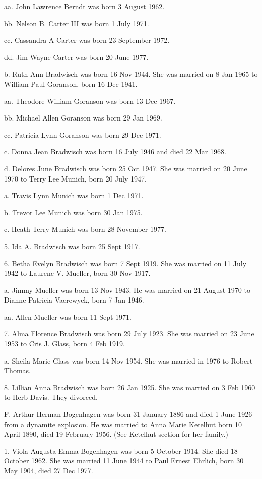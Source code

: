\documentclass[a4paper]{article}
\begin{document}
aa. John Lawrence Berndt was born 3 August 1962.

bb. Nelson B. Carter III was born 1 July 1971.

cc. Cassandra A Carter was born 23 September 1972.

dd. Jim Wayne Carter was born 20 June 1977.

b. Ruth Ann Bradwisch was born 16 Nov 1944.  She was married on 8 Jan 1965 to William Paul Goranson, born 16 Dec 1941.
 
aa. Theodore William Goranson was born 13 Dec 1967.

bb. Michael Allen Goranson was born 29 Jan 1969.

cc. Patricia Lynn Goranson was born 29 Dec 1971.

c. Donna Jean Bradwisch was born 16 July 1946 and died 22 Mar 1968.

d. Delores June Bradwisch was born 25 Oct 1947.  She was married on 20 June 1970 to Terry Lee Munich, born 20 July 1947.
 
a. Travis Lynn Munich was born 1 Dec 1971.

b. Trevor Lee Munich was born 30 Jan 1975.

c. Heath Terry Munich was born 28 November 1977.

5. Ida A. Bradwisch was born 25 Sept 1917.

6. Betha Evelyn Bradwisch was born 7 Sept 1919.  She was married on 11 July 1942 to Laurenc V. Mueller, born 30 Nov 1917.

a. Jimmy Mueller was born 13 Nov 1943.  He was married on 21 August 1970 to Dianne Patricia Vaerewyek, born 7 Jan 1946.
 
aa. Allen Mueller was born 11 Sept 1971.
 
7. Alma Florence Bradwisch was born 29 July 1923.  She was married on 23 June 1953 to Cris J. Glass, born 4 Feb 1919.
 
a. Sheila Marie Glass was born 14 Nov 1954.  She was married in 1976 to Robert  Thomas.
 
8. Lillian Anna Bradwisch was born 26 Jan 1925.  She was married on 3 Feb 1960 to Herb Davis.  They divorced.
 
F. Arthur Herman Bogenhagen was born 31 January 1886 and died 1 June 1926 from a dynamite explosion.  He was married to Anna Marie Ketelhut born 10 April 1890, died 19 February 1956.  (See Ketelhut section for her family.)

1. Viola Augusta Emma Bogenhagen was born 5 October 1914.  She died 18 October 1962.  She was married 11 June 1944 to Paul Ernest Ehrlich, born 30 May 1904, died 27 Dec 1977.
\end{document}
